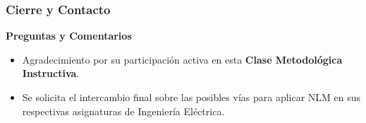 \documentclass[aspectratio=43]{beamer}
\begin{document}
\begin{frame}
\frametitle{ Cierre y Contacto}
\begin{center}
\textbf{\Huge{Preguntas y Comentarios}}
\end{center}
\vfill
\begin{itemize}
    \item Agradecimiento por su participación activa en esta \textbf{Clase Metodológica Instructiva}.
    \item Se solicita el intercambio final sobre las posibles vías para aplicar NLM en sus respectivas asignaturas de Ingeniería Eléctrica.
\end{itemize}
\end{frame}
\end{document}
